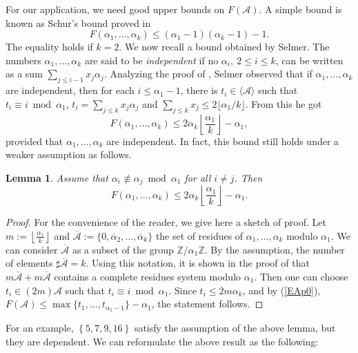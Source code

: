 \documentclass[11pt]{article}
\newtheorem{Lemma}[Theorem]{Lemma}
\def\Acal{{\mathcal A}}
\def\Zset{{\mathbb Z}}
\theoremstyle{remark}
\theoremstyle{definition}
\begin{document}
For our application, we  need good upper bounds on $F(\Acal)$. A  simple bound is known as Schur's bound proved in \cite{Bra}
\begin{equation}\label{EFRb1}
F(\alpha_1,\ldots,\alpha_k) \le (\alpha_1-1)(\alpha_k - 1) - 1.
\end{equation}
The equality holds if $k=2$. We now recall  a bound obtained by Selmer. The numbers $\alpha_1,\ldots,\alpha_k$ are said to be {\it independent} if no $\alpha_i,\ 2\le i\le k$, can be written as  a sum $\sum_{j\le i-1} x_j\alpha_j$. Analyzing the proof of \cite[Theorem 1]{EG}, Selmer observed that if $\alpha_1,\ldots,\alpha_k$ are independent, then for each $i\le \alpha_1 - 1$, there is $t_i \in 
\langle \Acal \rangle$ such that $t_i \equiv i \bmod \alpha_1$, $t_i = \sum_{j\le k} x_j\alpha_j$ and $\sum_{j\le k} x_j \le 2\lfloor \alpha_1/k \rfloor$.  From this he got
$$F(\alpha_1,\ldots,\alpha_k) \le 2 \alpha_k \left\lfloor \frac{\alpha_1}{k } \right\rfloor - \alpha_1,$$
provided that $\alpha_1,\ldots,\alpha_k$ are  independent. In fact, this bound still holds under a weaker assumption as follows.

\begin{Lemma} \label{Selmer1} Assume that $\alpha_i \not\equiv \alpha_j \bmod \alpha_1$ for all $i\neq j$. Then
$$F(\alpha_1,\ldots,\alpha_k) \le 2 \alpha_k \left\lfloor \frac{\alpha_1}{k } \right\rfloor - \alpha_1.$$
\end{Lemma}

\begin{proof} For the convenience of the reader, we give  here a sketch of proof.  Let $m:= \left\lfloor \frac{\alpha_1}{k } \right\rfloor $ and $\overline{\Acal} := \{ 0, \overline{\alpha}_2,\ldots, \overline{\alpha}_k \}$ the set of residues of $\alpha_1,\ldots,\alpha_k$ modulo $\alpha_1$. We can consider $\overline{\Acal}$ as a subset of the group $\Zset/\alpha_1\Zset$.
By the assumption, the number of elements  $\sharp \overline{\Acal} = k$. Using this notation, it is shown in the proof of \cite[Theorem 1]{EG} that $m \overline{\Acal} + m \overline{\Acal}$ contains a complete residues system modulo $\alpha_1$. Then one can choose $t_i \in (2m) \Acal 
$ such that  $t_i \equiv i \bmod \alpha_1$. Since $t_i \le 2m \alpha_k$,  and by (\ref{EAp0}),  
 $F(\Acal) \le \max\{ t_1,\ldots,t_{\alpha_1-1}\} - \alpha_1$,  the statement follows.
\end{proof}

For an example, $\left\{ 5,7,9,16 \right\}$ satisfy the assumption of the above lemma, but they are dependent. We can reformulate the above result as the following:
\end{document}

